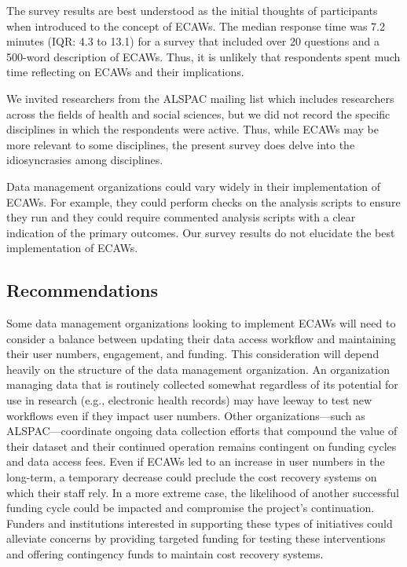 \documentclass[
  man,floatsintext]{apa6}
\begin{document}
The survey results are best understood as the initial thoughts of participants when introduced to the concept of ECAWs. The median response time was 7.2 minutes (IQR: 4.3 to 13.1) for a survey that included over 20 questions and a 500-word description of ECAWs. Thus, it is unlikely that respondents spent much time reflecting on ECAWs and their implications.

We invited researchers from the ALSPAC mailing list which includes researchers across the fields of health and social sciences, but we did not record the specific disciplines in which the respondents were active. Thus, while ECAWs may be more relevant to some disciplines, the present survey does delve into the idiosyncrasies among disciplines.

Data management organizations could vary widely in their implementation of ECAWs. For example, they could perform checks on the analysis scripts to ensure they run and they could require commented analysis scripts with a clear indication of the primary outcomes. Our survey results do not elucidate the best implementation of ECAWs.

\hypertarget{recommendations}{%
\subsection{Recommendations}\label{recommendations}}

Some data management organizations looking to implement ECAWs will need to consider a balance between updating their data access workflow and maintaining their user numbers, engagement, and funding. This consideration will depend heavily on the structure of the data management organization. An organization managing data that is routinely collected somewhat regardless of its potential for use in research (e.g., electronic health records) may have leeway to test new workflows even if they impact user numbers. Other organizations---such as ALSPAC---coordinate ongoing data collection efforts that compound the value of their dataset and their continued operation remains contingent on funding cycles and data access fees. Even if ECAWs led to an increase in user numbers in the long-term, a temporary decrease could preclude the cost recovery systems on which their staff rely. In a more extreme case, the likelihood of another successful funding cycle could be impacted and compromise the project's continuation. Funders and institutions interested in supporting these types of initiatives could alleviate concerns by providing targeted funding for testing these interventions and offering contingency funds to maintain cost recovery systems.
\end{document}
